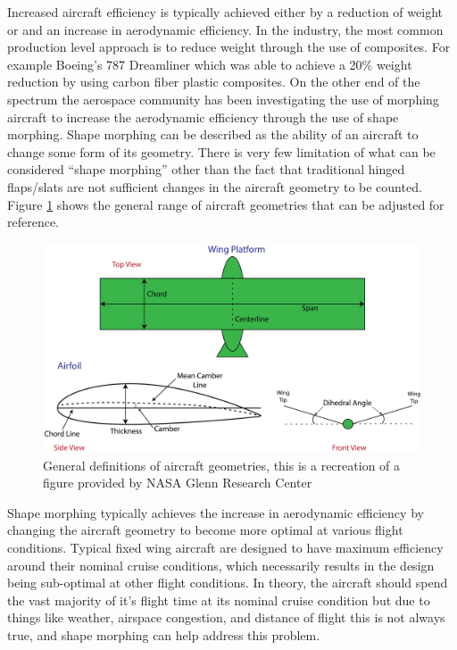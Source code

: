 \documentclass[11pt]{ucthesis}
\begin{document}
Increased aircraft efficiency is typically achieved either by a reduction of weight or and an increase in aerodynamic efficiency. In the industry, the most common production level approach is to reduce weight through the use of composites. For example Boeing's 787 Dreamliner which was able to achieve a 20\% weight reduction by using carbon fiber plastic composites. \cite{hale2006boeing} On the other end of the spectrum the aerospace community has been investigating the use of morphing aircraft to increase the aerodynamic efficiency through the use of shape morphing.\cite{barbarino2011review,kuzmina2002review,sofla2010shape} Shape morphing can be described as the ability of an aircraft to change some form of its geometry. There is very few limitation of what can be considered ``shape morphing'' other than the fact that traditional hinged flaps/slats are not sufficient changes in the aircraft geometry to be counted. Figure \ref{fig:airGeo} shows the general range of aircraft geometries that can be adjusted for reference. 

\begin{figure}[thpb]
\centering
\includegraphics[width=0.75\linewidth]{./Figures/AirCraftGeometry-01.png}
\caption{General definitions of aircraft geometries, this is a recreation of a figure provided by NASA Glenn Research Center}
\label{fig:airGeo}
\end{figure}

Shape morphing typically achieves the increase in aerodynamic efficiency by changing the aircraft geometry to become more optimal at various flight conditions. Typical fixed wing aircraft are designed to have maximum efficiency around their nominal cruise conditions, which necessarily results in the design being sub-optimal at other flight conditions. In theory, the aircraft should spend the vast majority of it's flight time at its nominal cruise condition but due to things like weather, airspace congestion, and distance of flight this is not always true, and shape morphing can help address this problem.  
\end{document}
